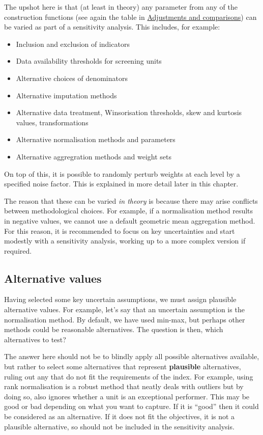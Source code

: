 \documentclass[
]{book}
\providecommand{\tightlist}{%
  \setlength{\itemsep}{0pt}\setlength{\parskip}{0pt}}
\begin{document}
The upshot here is that (at least in theory) any parameter from any of the construction functions (see again the table in \protect\hyperlink{adjustments-and-comparisons}{Adjustments and comparisons}) can be varied as part of a sensitivity analysis. This includes, for example:

\begin{itemize}
\tightlist
\item
  Inclusion and exclusion of indicators
\item
  Data availability thresholds for screening units
\item
  Alternative choices of denominators
\item
  Alternative imputation methods
\item
  Alternative data treatment, Winsorisation thresholds, skew and kurtosis values, transformations
\item
  Alternative normalisation methods and parameters
\item
  Alternative aggregration methods and weight sets
\end{itemize}

On top of this, it is possible to randomly perturb weights at each level by a specified noise factor. This is explained in more detail later in this chapter.

The reason that these can be varied \emph{in theory} is because there may arise conflicts between methodological choices. For example, if a normalisation method results in negative values, we cannot use a default geometric mean aggregation method. For this reason, it is recommended to focus on key uncertainties and start modestly with a sensitivity analysis, working up to a more complex version if required.

\hypertarget{alternative-values}{%
\subsection{Alternative values}\label{alternative-values}}

Having selected some key uncertain assumptions, we must assign plausible alternative values. For example, let's say that an uncertain assumption is the normalisation method. By default, we have used min-max, but perhaps other methods could be reasonable alternatives. The question is then, which alternatives to test?

The answer here should not be to blindly apply all possible alternatives available, but rather to select some alternatives that represent \textbf{plausible} alternatives, ruling out any that do not fit the requirements of the index. For example, using rank normalisation is a robust method that neatly deals with outliers but by doing so, also ignores whether a unit is an exceptional performer. This may be good or bad depending on what you want to capture. If it is ``good'' then it could be considered as an alternative. If it does not fit the objectives, it is not a plausible alternative, so should not be included in the sensitivity analysis.
\end{document}
